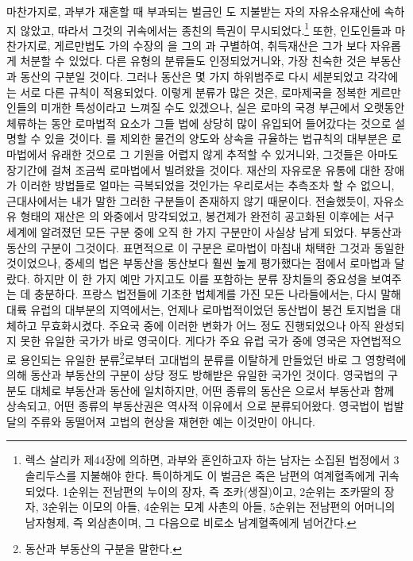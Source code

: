 마찬가지로,
과부가 재혼할 때 부과되는 벌금인
도
지불받는 자의 자유소유재산에 속하지 않았고,
따라서 그것의 귀속에서는 종친의 특권이 무시되었다.\footnote{%
  렉스 살리카 제44장에 의하면, 과부와 혼인하고자 하는 남자는
  소집된 법정에서 3솔리두스를 지불해야 한다. 특이하게도
  이 벌금은 죽은 남편의 여계혈족에게 귀속되었다.
  1순위는 전남편의 누이의 장자, 즉 조카(생질)이고,
  2순위는 조카딸의 장자,
  3순위는 이모의 아들,
  4순위는 모계 사촌의 아들,
  5순위는 전남편의 어머니의 남자형제, 즉 외삼촌이며,
  그 다음으로 비로소 남계혈족에게 넘어간다. }
또한, 인도인들과 마찬가지로,
게르만법도
가의 수장의 을 그의 과 구별하여,
취득재산은 그가 보다 자유롭게 처분할 수 있었다.
다른 유형의 분류들도 인정되었거니와,
가장 친숙한 것은 부동산과 동산의 구분일 것이다.
그러나 동산은 몇 가지 하위범주로 다시 세분되었고
각각에는 서로 다른 규칙이 적용되었다.
이렇게 분류가 많은 것은,
로마제국을 정복한 게르만인들의 미개한 특성이라고 느껴질 수도 있겠으나,
실은
로마의 국경 부근에서 오랫동안 체류하는 동안
로마법적 요소가 그들 법에 상당히 많이 유입되어 들어갔다는 것으로
설명할 수 있을 것이다.
를 제외한 물건의 양도와 상속을 규율하는 법규칙의 대부분은
로마법에서 유래한 것으로 그 기원을 어렵지 않게 추적할 수 있거니와,
그것들은 아마도 장기간에 걸쳐
조금씩 로마법에서 빌려왔을 것이다.
재산의 자유로운 유통에 대한 장애가
이러한 방법들로
얼마는 극복되었을 것인가는 우리로서는 추측조차 할 수 없으니,
근대사에서는 내가 말한 그러한 구분들이 존재하지 않기 때문이다.
전술했듯이,
자유소유 형태의 재산은 의 와중에서 망각되었고,
봉건제가 완전히 공고화된 이후에는
서구 세계에 알려졌던 모든 구분 중에 오직 한 가지 구분만이
사실상 남게 되었다.
부동산과 동산의 구분이 그것이다.
표면적으로 이 구분은 로마법이 마침내 채택한 그것과 동일한 것이었으나,
중세의 법은 부동산을 동산보다 훨씬 높게 평가했다는 점에서
로마법과 달랐다.
하지만 이 한 가지 예만 가지고도
이를 포함하는 분류 장치들의 중요성을 보여주는 데 충분하다.
%
프랑스 법전들에 기초한 법체계를 가진 모든 나라들에서는,
다시 말해 대륙 유럽의 대부분의 지역에서는,
언제나 로마법적이었던 동산법이 봉건 토지법을 대체하고 무효화시켰다.
주요국 중에
이러한 변화가 어느 정도 진행되었으나 아직 완성되지 못한
유일한 국가가 바로 영국이다.
게다가 주요 유럽 국가 중에 영국은
자연법적으로 용인되는 유일한
분류\footnote{%
  동산과 부동산의 구분을 말한다.
}로부터
고대법의 분류를 이탈하게 만들었던
바로 그 영향력에 의해
동산과 부동산의 구분이
상당 정도 방해받은
유일한 국가인 것이다.
영국법의 구분도 대체로 부동산과 동산에 일치하지만,
어떤 종류의 동산은 으로서 부동산과 함께 상속되고,
어떤 종류의 부동산권은 역사적 이유에서 으로 분류되어왔다.
영국법이
법발달의 주류와 동떨어져
고법의 현상을 재현한 예는 이것만이 아니다.

